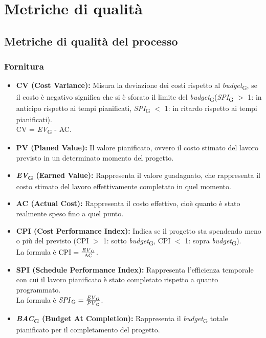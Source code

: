 \section{Metriche di qualità}\label{mdq}
\subsection{Metriche di qualità del processo}
\subsubsection{Fornitura}
\begin{itemize}
    \item \textbf{CV (Cost Variance):} Misura la deviazione dei costi rispetto al \textit{budget}\textsubscript{G}, se il costo è negativo significa che si è sforato il limite del \textit{budget}\textsubscript{G}(\textit{SPI}\textsubscript{G} \( > \) 1: in anticipo rispetto ai tempi pianificati, \textit{SPI}\textsubscript{G} \( < \) 1: in ritardo rispetto ai tempi pianificati).
    \\CV = \textit{EV}\textsubscript{G} - AC.
    \item \textbf{PV (Planed Value):} Il valore pianificato, ovvero il costo stimato del lavoro previsto in un determinato momento del progetto.
    \item \textbf{\textit{EV}\textsubscript{G} (Earned Value):} Rappresenta il valore guadagnato, che rappresenta il costo stimato del lavoro effettivamente completato in quel momento.
    \item \textbf{AC (Actual Cost):} Rappresenta il costo effettivo, cioè quanto è stato realmente speso fino a quel punto.
    \item \textbf{CPI (Cost Performance Index):} Indica se il progetto sta spendendo meno o più del previsto (CPI \( > \) 1: sotto \textit{budget}\textsubscript{G}, CPI \( < \) 1: sopra \textit{budget}\textsubscript{G}). \\ La formula è \( \text{CPI} = \frac{\text{\textit{EV}\textsubscript{G}}}{\text{AC}} \).
    \item \textbf{SPI (Schedule Performance Index):} Rappresenta l'efficienza temporale con cui il lavoro pianificato è stato completato rispetto a quanto programmato.
    \\ La formula è \( \text{\textit{SPI}\textsubscript{G}} = \frac{\text{\textit{EV}\textsubscript{G}}}{\text{\textit{PV}\textsubscript{G}}} \).
    \item \textbf{\textit{BAC}\textsubscript{G} (Budget At Completion):} Rappresenta il \textit{budget}\textsubscript{G} totale pianificato per il completamento del progetto.

\end{itemize}

